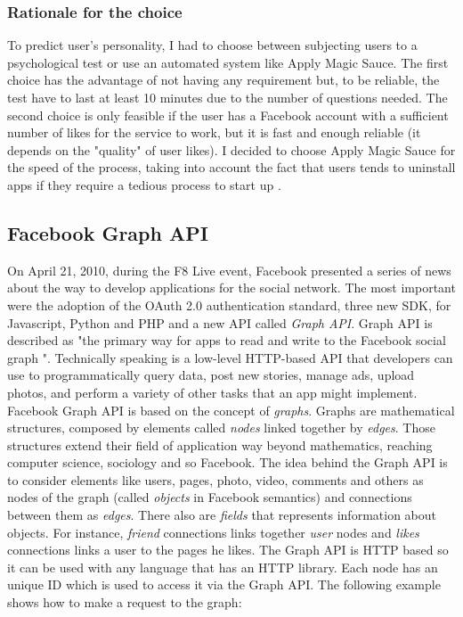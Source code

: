 \documentclass[b5paper,10pt,twoside,cucitura]{toptesi}
\begin{document}
\subsubsection{Rationale for the choice}

To predict user's personality, I had to choose between subjecting users to a psychological test or use an automated system like Apply Magic Sauce. The first choice has the advantage of not having any requirement but, to be reliable, the test have to last at least 10 minutes due to the number of questions needed. The second choice is only feasible if the user has a Facebook account with a sufficient number of likes for the service to work, but it is fast and enough reliable (it depends on the "quality" of user likes). I decided to choose Apply Magic Sauce for the speed of the process, taking into account the fact that users tends to uninstall apps if they require a tedious process to start up  \citep{clevertap}. 

\subsection{Facebook Graph API}

On April 21, 2010, during the F8 Live event, Facebook presented a series of news about the way to develop applications for the social network. The most important were the adoption of the OAuth 2.0 authentication standard, three new SDK, for Javascript, Python and PHP and a new API called \textit{Graph API}. Graph API is described as "the primary way for apps to read and write to the Facebook social graph  \citep{graphapi}". Technically speaking is a low-level HTTP-based API that developers can use to programmatically query data, post new stories, manage ads, upload photos, and perform a variety of other tasks that an app might implement. Facebook Graph API is based on the concept of \textit{graphs}. Graphs are mathematical structures, composed by elements called \textit{nodes} linked together by \textit{edges}. Those structures extend their field of application way beyond mathematics, reaching computer science, sociology and so Facebook. The idea behind the Graph API is to consider elements like users, pages, photo, video, comments and others as nodes of the graph (called \textit{objects} in Facebook semantics) and connections between them as \textit{edges}. There also are \textit{fields} that represents information about objects. For instance, \textit{friend} connections links together \textit{user} nodes and \textit{likes} connections links a user to the pages he likes. The Graph API is HTTP based so it can be used with any language that has an HTTP library. Each node has an unique ID which is used to access it via the Graph API. The following example shows how to make a request to the graph:
\end{document}
